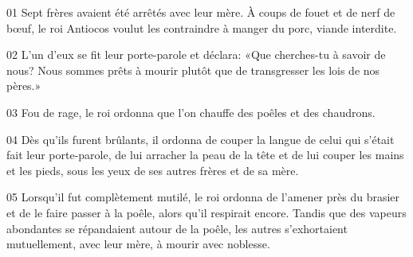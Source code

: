 01 Sept frères avaient été arrêtés avec leur mère. À coups de fouet et de nerf de bœuf, le roi Antiocos voulut les contraindre à manger du porc, viande interdite.

02 L’un d’eux se fit leur porte-parole et déclara: «Que cherches-tu à savoir de nous? Nous sommes prêts à mourir plutôt que de transgresser les lois de nos pères.»

03 Fou de rage, le roi ordonna que l’on chauffe des poêles et des chaudrons.

04 Dès qu’ils furent brûlants, il ordonna de couper la langue de celui qui s’était fait leur porte-parole, de lui arracher la peau de la tête et de lui couper les mains et les pieds, sous les yeux de ses autres frères et de sa mère.

05 Lorsqu’il fut complètement mutilé, le roi ordonna de l’amener près du brasier et de le faire passer à la poêle, alors qu’il respirait encore. Tandis que des vapeurs abondantes se répandaient autour de la poêle, les autres s’exhortaient mutuellement, avec leur mère, à mourir avec noblesse.